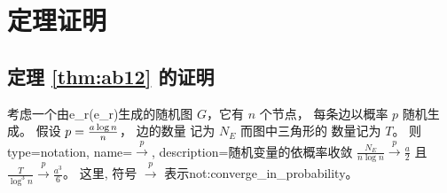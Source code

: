\section{定理证明}\label{sec:sibm_proof}
\subsection{定理 \ref{thm:ab12} 的证明}
\begin{lemma}\label{lem:ER_tr_counting}
  考虑一个由\gls{e_r}(\glsdesc{e_r})生成的随机图 $G$，它有  $n$
  个节点， 每条边以概率 $p$ 随机生成\cite{erdHos1960evolution}。
   假设
	$p=\frac{a \log n}{n}$， 边的数量
  记为  $N_E$ 
  而图中三角形的
  数量记为  $T$。 则
{
  type=notation,
  name={$\xrightarrow{p}$},
  description={随机变量的依概率收敛}
}
	$\frac{N_E}{n \log n} \xrightarrow{p} \frac{a}{2}$ 且
  $\frac{T}{\log^3 n} \xrightarrow{p} \frac{a^3}{6}$。
  这里, 符号 $\xrightarrow{p}$ 表示\glsdesc{not:converge_in_probability}。
\end{lemma}
